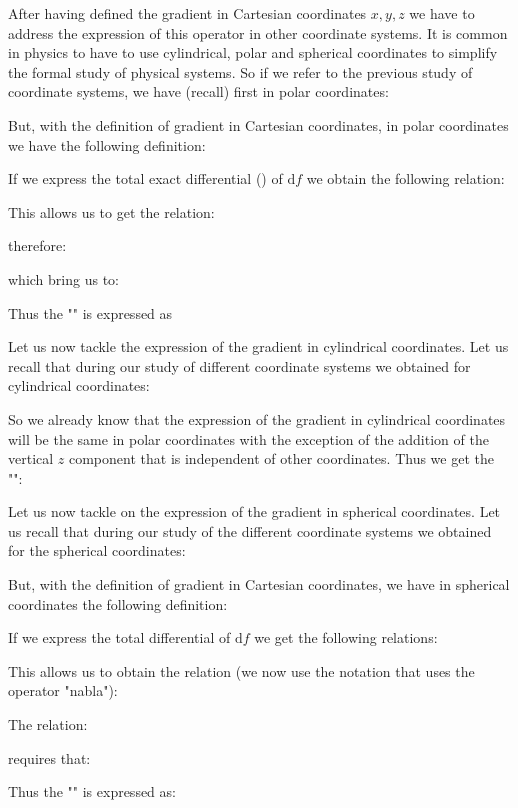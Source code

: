 	After having defined the gradient in Cartesian coordinates $x, y, z$ we have to address the expression of this operator in other coordinate systems. It is common in physics to have to use cylindrical, polar and spherical coordinates to simplify the formal study of physical systems. So if we refer to the previous study of coordinate systems, we have (recall) first in polar coordinates:
	
	But, with the definition of gradient in Cartesian coordinates, in polar coordinates we have the following definition:
	
	If we express the total exact differential () of $\mathrm{d}f$ we obtain the following relation:
	
	This allows us to get the relation:
	
	therefore:
	
	which bring us to:
	
	Thus the "" is expressed as
	
	Let us now tackle the expression of the gradient in cylindrical coordinates. Let us recall that  during our study of different coordinate systems we obtained for cylindrical coordinates:
	
	So we already know that the expression of the gradient in cylindrical coordinates will be the same in polar coordinates with the exception of the addition of the vertical $z$ component that is independent of other coordinates. Thus we get the "":
	 
	Let us now tackle on the expression of the gradient in spherical coordinates. Let us recall that during our study of the different coordinate systems we obtained for the spherical coordinates:
	
	But, with the definition of gradient in Cartesian coordinates, we have in spherical coordinates the following definition:
	
	If we express the total differential of $\mathrm{d}f$ we get the following relations:
	
	This allows us to obtain the relation (we now use the notation that uses the operator "nabla"):
	
	The relation:
	
	requires that:
	
	Thus the "" is expressed as:
	 
